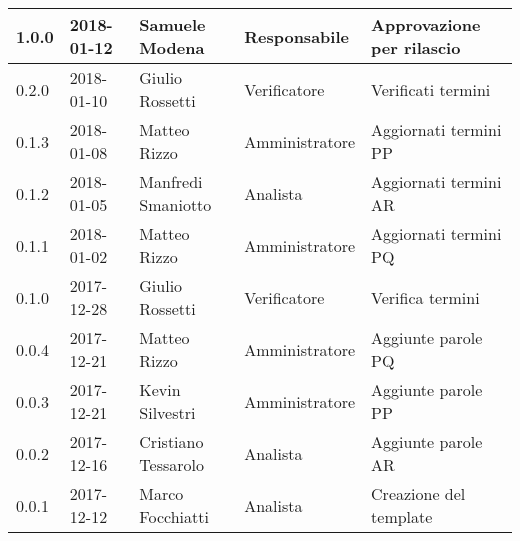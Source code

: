 \documentclass[./AnalisideiRequisiti.tex]{subfiles}
\begin{document}
{\begin{longtable}{|p{20mm}|p{20mm}|p{40mm}|p{30mm}|p{50mm}|}
		1.0.0 & 2018-01-12 & Samuele Modena & Responsabile & Approvazione per rilascio\\ \hline
		0.2.0 & 2018-01-10 & Giulio Rossetti & Verificatore & Verificati termini\\ \hline
		0.1.3 & 2018-01-08 & Matteo Rizzo & Amministratore & Aggiornati termini PP\\ \hline
		0.1.2 & 2018-01-05 & Manfredi Smaniotto & Analista & Aggiornati termini AR \\ \hline		
		0.1.1 & 2018-01-02 & Matteo Rizzo & Amministratore & Aggiornati termini PQ\\ \hline	
	   	0.1.0 & 2017-12-28 & Giulio Rossetti & Verificatore & Verifica termini\\ \hline		
		0.0.4 & 2017-12-21 & Matteo Rizzo & Amministratore & Aggiunte parole PQ \\ \hline
		0.0.3 & 2017-12-21 & Kevin Silvestri & Amministratore & Aggiunte parole PP \\ \hline
		0.0.2 & 2017-12-16 & Cristiano Tessarolo & Analista & Aggiunte parole AR\\ \hline
		0.0.1 & 2017-12-12 & Marco Focchiatti & Analista & Creazione del template\\ \hline
	\end{longtable}

}	
\end{document}
